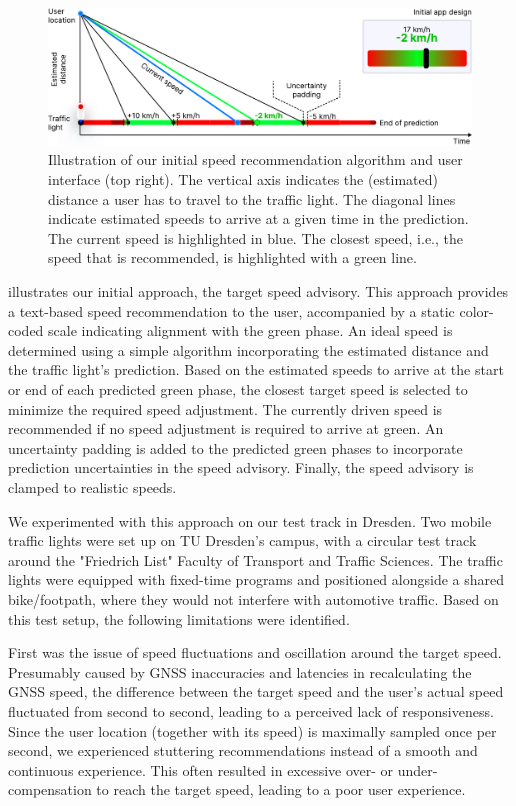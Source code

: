 \begin{figure}[t]
\centering
\includegraphics[width=\linewidth]{images/graph-based-speed-recommendation.pdf}
\caption{Illustration of our initial speed recommendation algorithm and user interface (top right). The vertical axis indicates the (estimated) distance a user has to travel to the traffic light. The diagonal lines indicate estimated speeds to arrive at a given time in the prediction. The current speed is highlighted in blue. The closest speed, i.e., the speed that is recommended, is highlighted with a green line.}
\label{fig:graph-based-speed-recommendation}
\end{figure}

 illustrates our initial approach, the target speed advisory. This approach provides a text-based speed recommendation to the user, accompanied by a static color-coded scale indicating alignment with the green phase. An ideal speed is determined using a simple algorithm incorporating the estimated distance and the traffic light's prediction. Based on the estimated speeds to arrive at the start or end of each predicted green phase, the closest target speed is selected to minimize the required speed adjustment. The currently driven speed is recommended if no speed adjustment is required to arrive at green. An uncertainty padding is added to the predicted green phases to incorporate prediction uncertainties in the speed advisory. Finally, the speed advisory is clamped to realistic speeds.

We experimented with this approach on our test track in Dresden. Two mobile traffic lights were set up on TU Dresden's campus, with a circular test track around the "Friedrich List" Faculty of Transport and Traffic Sciences. The traffic lights were equipped with fixed-time programs and positioned alongside a shared bike/footpath, where they would not interfere with automotive traffic. Based on this test setup, the following limitations were identified.

First was the issue of speed fluctuations and oscillation around the target speed. Presumably caused by GNSS inaccuracies and latencies in recalculating the GNSS speed, the difference between the target speed and the user's actual speed fluctuated from second to second, leading to a perceived lack of responsiveness. Since the user location (together with its speed) is maximally sampled once per second, we experienced stuttering recommendations instead of a smooth and continuous experience. This often resulted in excessive over- or under-compensation to reach the target speed, leading to a poor user experience.

